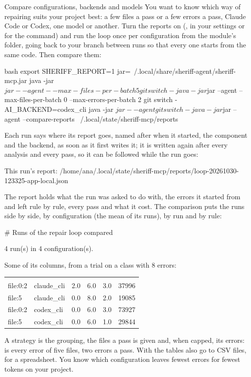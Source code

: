 \documentclass[11pt,a4paper]{article}
\begin{document}
\begin{play}{Compare configurations, backends and models}
\when You want to know which way of repairing suits your project best: a few
files a pass or a few errors a pass, Claude Code or Codex, one model or
another.
\asks Turn the reports on (, in your settings or for
the command) and run the loop once per configuration from the module's folder,
going back to your branch between runs so that every one starts from the same
code. Then compare them:
\begin{command}[basicstyle=\ttfamily\footnotesize]{bash}
export SHERIFF_REPORT=1
jar=~/.local/share/sheriff-agent/sheriff-mcp.jar
java -jar $jar --agent --max-files-per-batch 5
git switch -
java -jar $jar --agent --max-files-per-batch 0 --max-errors-per-batch 2
git switch -
AI_BACKEND=codex_cli java -jar $jar --agent
git switch -
java -jar $jar --agent --compare-reports ~/.local/state/sheriff-mcp/reports
\end{command}
\happens Each run says where its report goes, named after when it started,
the component and the backend, as soon as it first writes it; it is written
again after every analysis and every pass, so it can be followed while the
run goes:
\begin{answer}
This run's report: /home/ana/.local/state/sheriff-mcp/reports/loop-20261030-123325-app-local.json
\end{answer}
The report holds what the run was asked to do with, the errors it started
from and left rule by rule, every pass and what it cost. The comparison puts
the runs side by side, by configuration (the mean of its runs), by run and by
rule:
\begin{answer}
# Runs of the repair loop compared

4 run(s) in 4 configuration(s).
\end{answer}
Some of its columns, from a trial on a class with 8 errors:

\begin{center}
\begin{tabularx}{0.95\linewidth}{@{\hspace{6pt}}>{\ttfamily}p{16mm}>{\ttfamily}p{18mm}LLLL}
\headrow {} &  &  &  &  &  \\
file:0:2 & claude\_cli & 2.0 & 6.0 & 3.0 & 37996 \\
file:5 & claude\_cli & 0.0 & 8.0 & 2.0 & 19085 \\
file:0:2 & codex\_cli & 0.0 & 6.0 & 3.0 & 73927 \\
file:5 & codex\_cli & 0.0 & 6.0 & 1.0 & 29844 \\
\end{tabularx}
\end{center}
A strategy is the grouping, the files a pass is given and, when capped, its
errors:  is every error of five files,  two
errors a pass. With  the tables also go to CSV files, for a
spreadsheet.
\done You know which configuration leaves fewest errors for fewest tokens on
your project.
\end{play}
\end{document}

